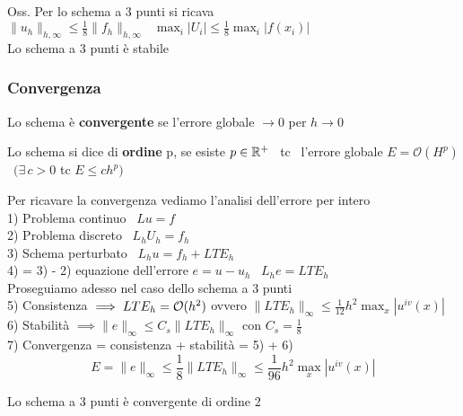 \documentclass{article}
\let \oldexists \exists
\renewcommand{\exists}{\oldexists\,}
\begin{document}
Oss. Per lo schema a 3 punti si ricava \ $\|u_h\|_{h,\infty}\le \frac{1}{8}\|f_h\|_{h,\infty} \ \ \ \displaystyle\max_i|U_i|\le \frac{1}{8}\max_i|f(x_i)|$\\
Lo schema a 3 punti è stabile\\




\subsubsection{Convergenza}

\begin{defi}
    Lo schema è \textbf{convergente} se l'errore globale $\to 0$ per $h\to 0$
\end{defi}

\begin{defi}
    Lo schema si dice di \textbf{ordine} p, se esiste $p\in\mathbb R^+$ \ tc \ l'errore globale $E=\mathcal{O}(H^p)$ \ $\big( \exists c>0$ tc $E\le ch^p\big)$
\end{defi}


\phantom{}


Per ricavare la convergenza vediamo l'analisi dell'errore per intero\\

1)  Problema continuo \ $Lu=f$\\

2) Problema discreto \ $L_hU_h=f_h$\\

3) Schema perturbato \ $L_h u = f_h + LTE_h$\\

4) = 3) - 2) equazione dell'errore $e=u-u_h$ \ $L_h e=LTE_h$\\

Proseguiamo adesso nel caso dello schema a 3 punti\\

5) Consistenza $\implies LTE_h=\mathcal O(h^2)$ ovvero $\|LTE_h\|_{\infty}\le \frac{1}{12}h^2\displaystyle\max_x|u^{iv}(x)|$\\

6) Stabilità $\implies \|e\|_{\infty} \le C_s\|LTE_h\|_{\infty}$ con $C_s=\frac{1}{8}$\\

7) Convergenza = consistenza + stabilità = 5) + 6)
\[
E=\|e\|_{\infty}\le \frac18\|LTE_h\|_{\infty} \le \frac{1}{96}h^2\displaystyle\max_x|u^{iv}(x)|
\]

Lo schema a 3 punti è convergente di ordine 2\\
\end{document}
